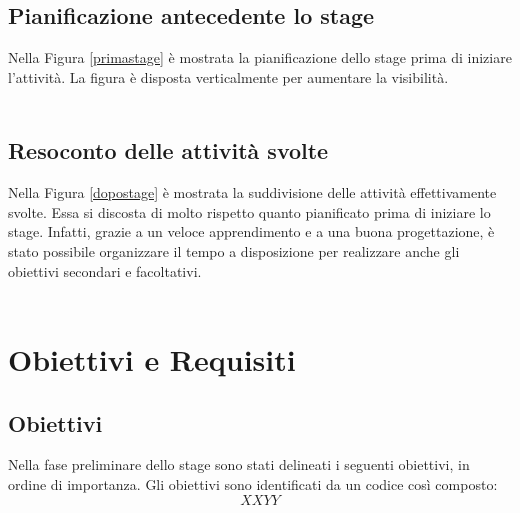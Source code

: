 \subsection{Pianificazione antecedente lo stage}
Nella Figura \ref{primastage} è mostrata la pianificazione dello stage prima di iniziare l'attività. La figura è disposta verticalmente per aumentare la visibilità.
\\
\\

\newpage

\subsection{Resoconto delle attività svolte}
Nella Figura \ref{dopostage} è mostrata la suddivisione delle attività effettivamente svolte. Essa si discosta di molto rispetto quanto pianificato prima di iniziare lo stage. Infatti, grazie a un veloce apprendimento e a una buona progettazione, è stato possibile organizzare il tempo a disposizione per realizzare anche gli obiettivi secondari e facoltativi.
\\
\\
\newpage

\section{Obiettivi e Requisiti}

\subsection{Obiettivi}
Nella fase preliminare dello stage sono stati delineati i seguenti obiettivi, in ordine di importanza. Gli obiettivi sono identificati da un codice così composto:
$$ XXYY $$

